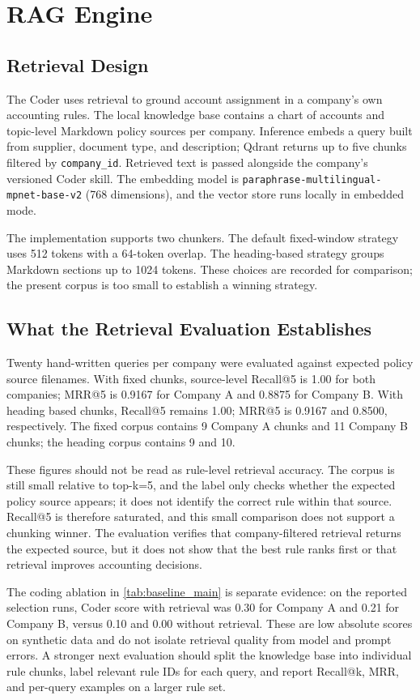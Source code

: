 \section{RAG Engine}
\label{sec:rag}

\subsection{Retrieval Design}

The Coder uses retrieval to ground account assignment in a company's own
accounting rules. The local knowledge base contains a chart of accounts and
topic-level Markdown policy sources per company. Inference embeds a query built
from supplier, document type, and description; Qdrant returns up to five chunks
filtered by \texttt{company\_id}. Retrieved text is passed alongside the
company's versioned Coder skill. The embedding model is
\texttt{paraphrase-multilingual-mpnet-base-v2} (768 dimensions), and the vector
store runs locally in embedded mode.

The implementation supports two chunkers. The default fixed-window strategy
uses 512 tokens with a 64-token overlap. The heading-based strategy groups
Markdown sections up to 1024 tokens. These choices are recorded for comparison;
the present corpus is too small to establish a winning strategy.

\subsection{What the Retrieval Evaluation Establishes}

Twenty hand-written queries per company were evaluated against expected policy
source filenames. With fixed chunks, source-level Recall@5 is 1.00 for both
companies; MRR@5 is 0.9167 for Company A and 0.8875 for Company B. With heading
based chunks, Recall@5 remains 1.00; MRR@5 is 0.9167 and 0.8500, respectively.
The fixed corpus contains 9 Company A chunks and 11 Company B chunks; the
heading corpus contains 9 and 10.

These figures should not be read as rule-level retrieval accuracy. The corpus
is still small relative to top-k=5, and the label only checks whether the
expected policy source appears; it does not identify the correct rule within
that source. Recall@5 is therefore saturated, and this small comparison does
not support a chunking winner. The evaluation verifies that company-filtered
retrieval returns the expected source, but it does not show that the best rule
ranks first or that retrieval improves accounting decisions.

The coding ablation in \cref{tab:baseline_main} is separate evidence: on the
reported selection runs, Coder score with retrieval was 0.30 for Company A and
0.21 for Company B, versus 0.10 and 0.00 without retrieval. These are low
absolute scores on synthetic data and do not isolate retrieval quality from
model and prompt errors. A stronger next evaluation should split the knowledge
base into individual rule chunks, label relevant rule IDs for each query, and
report Recall@k, MRR, and per-query examples on a larger rule set.
